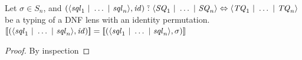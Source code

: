 \documentclass[acmsmall]{acmart}
\begin{document}
\begin{lemma}
  \label{lem:dnfl-perm-sem-ineffective}
  Let $\sigma\in S_n$, and
  $(\langle\mathit{sql}_1 ~|~ \ldots ~|~ \mathit{sql}_n\rangle,\mathit{id}) \,\,\tilde{:}\,\,
  \langle\mathit{SQ}_1 ~|~ \ldots ~|~ \mathit{SQ}_n\rangle \Leftrightarrow
  \langle\mathit{TQ}_1 ~|~ \ldots ~|~ \mathit{TQ}_n\rangle$ be a typing of a DNF lens with
  an identity permutation.
  $[ \! [(\langle\mathit{sql}_1 ~|~ \ldots ~|~ \mathit{sql}_n\rangle,\mathit{id})] \! ]
  =[ \! [(\langle\mathit{sql}_1 ~|~ \ldots ~|~ \mathit{sql}_n\rangle,\sigma)] \! ]$
\end{lemma}
\begin{proof}
  By inspection
\end{proof}
\end{document}
